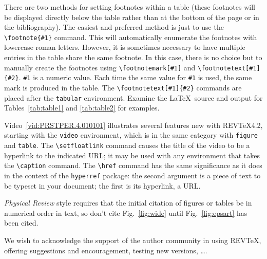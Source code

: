 \documentclass[%
 reprint,
 amsmath,amssymb,
 aps,
]{revtex4-2}
\begin{document}
There are two methods for setting footnotes within a table (these
footnotes will be displayed directly below the table rather than at
the bottom of the page or in the bibliography). The easiest
and preferred method is just to use the \verb+\footnote{#1}+
command. This will automatically enumerate the footnotes with
lowercase roman letters. However, it is sometimes necessary to have
multiple entries in the table share the same footnote. In this case,
there is no choice but to manually create the footnotes using
\verb+\footnotemark[#1]+ and \verb+\footnotetext[#1]{#2}+.
\texttt{\#1} is a numeric value. Each time the same value for
\texttt{\#1} is used, the same mark is produced in the table. The
\verb+\footnotetext[#1]{#2}+ commands are placed after the \texttt{tabular}
environment. Examine the \LaTeX\ source and output for
Tables~\ref{tab:table1} and \ref{tab:table2}
for examples.

Video~\ref{vid:PRSTPER.4.010101} 
illustrates several features new with REV\TeX4.2,
starting with the \texttt{video} environment, which is in the same category with
\texttt{figure} and \texttt{table}.%
The \verb+\setfloatlink+ command causes the title of the video to be a hyperlink to the
indicated URL; it may be used with any environment that takes the \verb+\caption+
command.
The \verb+\href+ command has the same significance as it does in the context of
the \texttt{hyperref} package: the second argument is a piece of text to be 
typeset in your document; the first is its hyperlink, a URL.

\textit{Physical Review} style requires that the initial citation of
figures or tables be in numerical order in text, so don't cite
Fig.~\ref{fig:wide} until Fig.~\ref{fig:epsart} has been cited.

\begin{acknowledgments}
We wish to acknowledge the support of the author community in using
REV\TeX{}, offering suggestions and encouragement, testing new versions,
\dots.
\end{acknowledgments}
\end{document}
